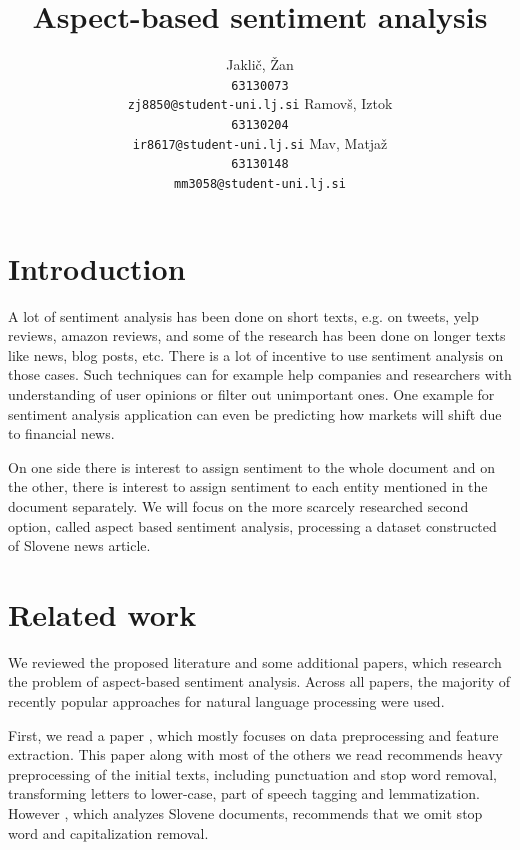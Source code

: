 \documentclass[11pt,a4paper]{article}
\title{Aspect-based sentiment analysis}
\author{
  Jaklič, Žan \\ \texttt{63130073} \\ {\tiny \texttt{zj8850@student-uni.lj.si}}
  \And
  Ramovš, Iztok \\ \texttt{63130204} \\ {\tiny \texttt{ir8617@student-uni.lj.si}}
  \And
  Mav, Matjaž \\ \texttt{63130148} \\ {\tiny \texttt{mm3058@student-uni.lj.si}}
}
\date{}
\begin{document}
\maketitle

\iftaclpubformat
\section{Introduction}

A lot of sentiment analysis has been done on short texts, e.g. on tweets, yelp reviews, amazon reviews, and some of the research has been done on longer texts like news, blog posts, etc. There is a lot of incentive to use sentiment analysis on those cases. Such techniques can for example help companies and researchers with understanding of user opinions or filter out unimportant ones. One example for sentiment analysis application can even be predicting how markets will shift due to financial news.

On one side there is interest to assign sentiment to the whole document and on the other, there is interest to assign sentiment to each entity mentioned in the document separately. We will focus on the more scarcely researched second option, called aspect based sentiment analysis, processing a dataset constructed of Slovene news article. 

\section{Related work}

We reviewed the proposed literature and some additional papers, which research the problem of aspect-based sentiment analysis. Across all papers, the majority of recently popular approaches for natural language processing were used. 

First, we read a paper \cite{asghar}, which mostly focuses on data preprocessing and feature extraction. This paper along with most of the others we read recommends heavy preprocessing of the initial texts, including punctuation and stop word removal, transforming letters to lower-case, part of speech tagging and lemmatization. However \cite{c_sentinews}, which analyzes Slovene documents, recommends that we omit stop word and capitalization removal.
\end{document}

